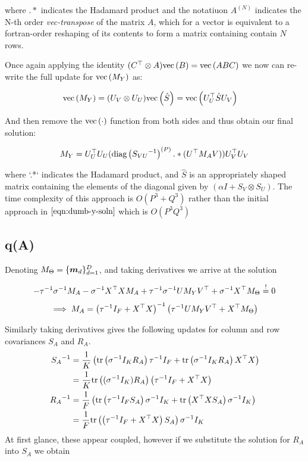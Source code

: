 where $.*$ indicates the Hadamard product and the notatiuon $A^{(N)}$ indicates the N-th order \emph{vec-transpose}\cite{Minka2000a} of the matrix $A$, which for a vector is equivalent to a fortran-order reshaping of its contents to form a matrix containing contain $N$ rows.

Once again applying the identity $(C^\top \otimes A)\text{vec}\left(B\right) = \text{vec}\left(ABC\right)$ we now can re-write the full update for $\text{vec}\left(M_Y\right)$ as:

\begin{align}
\text{vec}\left(M_Y\right) & = (U_V \otimes U_U)\text{vec}\left(\hat S\right) = \text{vec}\left(U_U^\top \hat S U_V\right)
\end{align}

And then remove the $\text{vec}\left(\cdot\right)$ function from both sides and thus obtain our final solution:

\begin{align}
M_Y = U_U^\top U_U (\text{diag} \left( {{S_{VU}}^{-1}} \right)^{(P)} .* (U^\top M_A V)) U_V^\top U_V
\end{align}

where `.*` indicates the Hadamard product, and $\hat S$ is an appropriately shaped matrix containing the elements of the diagonal given by $(\alpha I + S_V \otimes S_U)$. The time complexity of this approach is $O(P^3 + Q^3)$ rather than the initial approach in $\eqref{eqn:dumb-y-soln}$ which is $O(P^3Q^3)$


\subsection{q(A)}
Denoting $M_\Theta = \{ \bm m_d \}_{d=1}^D$, and taking derivatives we arrive at the solution

\begin{align}
- {\tau}^{-1}{\sigma}^{-1} M_A 
- {\sigma}^{-1} X^\top X M_A
+ {\tau}^{-1} {\sigma}^{-1} UM_YV^\top
+ {\sigma}^{-1} X^\top M_\Theta
\overset{!}{=} 0\end{align}\begin{align}
\implies M_A = {\left( {\tau}^{-1} I_F + X^\top X \right)}^{-1}\left({\tau}^{-1} UM_YV^\top + X^\top M_\Theta \right)
\end{align}

Similarly taking derivatives gives the following updates for column and row covariances $S_A$ and $R_A$. 
\begin{align}
{S_A}^{-1}
    & = \frac{1}{ {K} } \left( \text{tr} \left( {{\sigma}^{-1} I_K R_A} \right){\tau}^{-1} I_F + \text{tr} \left( {{\sigma}^{-1} I_K R_A} \right) X^\top X  \right) \\
    & = \frac{1}{ {K} }  \text{tr} \left( {({\sigma}^{-1} I_K) R_A} \right)\left({\tau}^{-1} I_F + X^\top X\right) \\
{R_A}^{-1} 
    & = \frac{1}{ {F} } \left( \text{tr} \left( {{\tau}^{-1} I_F S_A} \right){\sigma}^{-1} I_K + \text{tr} \left( {X^\top X S_A} \right){\sigma}^{-1} I_K \right)\\
    & = \frac{1}{ {F} } \text{tr} \left( {\left({\tau}^{-1} I_F + X^\top X \right) S_A} \right){\sigma}^{-1} I_K
\end{align}
At first glance, these appear coupled, however if we substitute the solution for $R_A$ into $S_A$ we obtain

